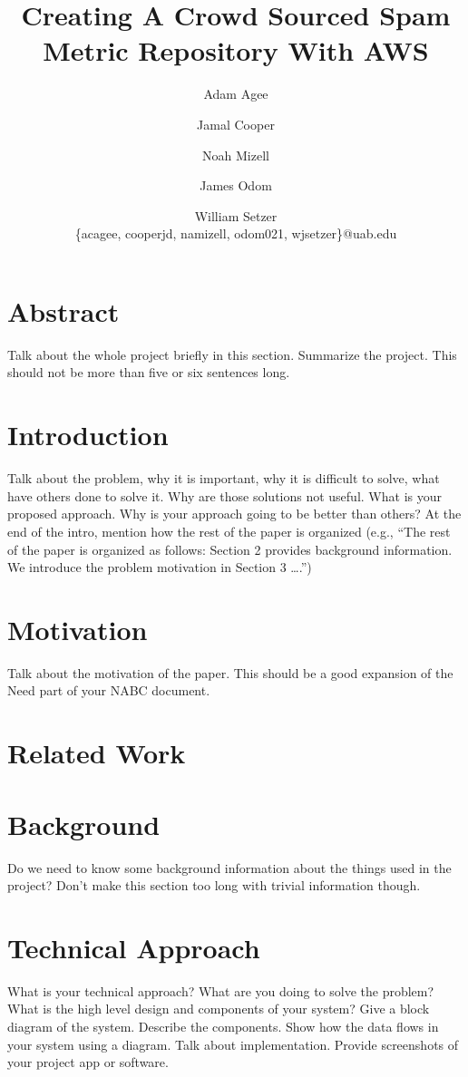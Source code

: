 \documentclass[11pt]{article}
\title{Creating A Crowd Sourced Spam Metric Repository With AWS}
\author{Adam Agee \and Jamal Cooper \and Noah Mizell \and James Odom \and William Setzer \\ \{acagee, cooperjd, namizell, odom021, wjsetzer\}@uab.edu}
\begin{document}
\maketitle


\begin{multicols}{2}

  \section*{Abstract}

  Talk about the whole project briefly in this section. Summarize the project. This should not be more than five or six sentences long.

  \section{Introduction} 

Talk about the problem, why it is important, why it is difficult to solve, what have others done to solve it. Why are those solutions not useful. What is your proposed approach. Why is your approach going to be better than others?
 At the end of the intro, mention how the rest of the paper is organized (e.g., “The rest of the paper is organized as follows: Section 2 
provides background information. We introduce the problem motivation in Section 3 ….”)

  \section{Motivation}
 Talk about the motivation of the paper. This should be a good expansion of the Need part of your NABC document.

  \section{Related Work}
 
  \section{Background}
Do we need to know some background information about the things used in the project? Don’t make this section too long with trivial information though.

  \section{Technical Approach}
What is your technical approach? What are you doing to solve the problem? What is the high level design and components of your system? Give a block diagram of the system. Describe the components. Show how the data flows in your system using a diagram. Talk about implementation. Provide screenshots of your project app or software.


\end{multicols}
\end{document}
